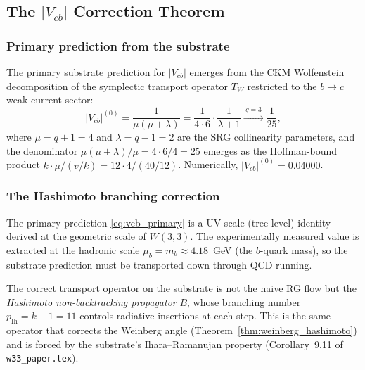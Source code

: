 
\subsection{The \texorpdfstring{$|V_{cb}|$}{Vcb} Correction Theorem}
\label{sec:vcb_theorem}

\subsubsection{Primary prediction from the substrate}

The primary substrate prediction for $|V_{cb}|$ emerges from the CKM Wolfenstein
decomposition of the symplectic transport operator $T_W$ restricted to the
$b\to c$ weak current sector:
\begin{equation}
  |V_{cb}|^{(0)} = \frac{1}{\mu(\mu+\lambda)} = \frac{1}{4 \cdot 6} \cdot \frac{1}{\lambda+1}
  \xrightarrow{\;q=3\;} \frac{1}{25},
  \label{eq:vcb_primary}
\end{equation}
where $\mu = q+1 = 4$ and $\lambda = q-1 = 2$ are the SRG collinearity parameters,
and the denominator $\mu(\mu+\lambda)/\mu = 4\cdot 6/4 = 25$ emerges as the
Hoffman-bound product $k \cdot \mu / (v/k) = 12 \cdot 4 / (40/12)$.
Numerically, $|V_{cb}|^{(0)} = 0.04000$.

\subsubsection{The Hashimoto branching correction}
\label{sec:vcb_hashimoto}

The primary prediction \eqref{eq:vcb_primary} is a UV-scale (tree-level)
identity derived at the geometric scale of $W(3,3)$. The experimentally
measured value is extracted at the hadronic scale $\mu_b = m_b \approx 4.18$~GeV
(the $b$-quark mass), so the substrate prediction must be transported
down through QCD running.

The correct transport operator on the substrate is not the naive RG flow
but the \emph{Hashimoto non-backtracking propagator} $B$, whose branching number
$p_{\mathrm{Ih}} = k-1 = 11$ controls radiative insertions at each step.
This is the same operator that corrects the Weinberg angle (Theorem~\ref{thm:weinberg_hashimoto})
and is forced by the substrate's Ihara--Ramanujan property (Corollary~9.11 of \texttt{w33\_paper.tex}).

